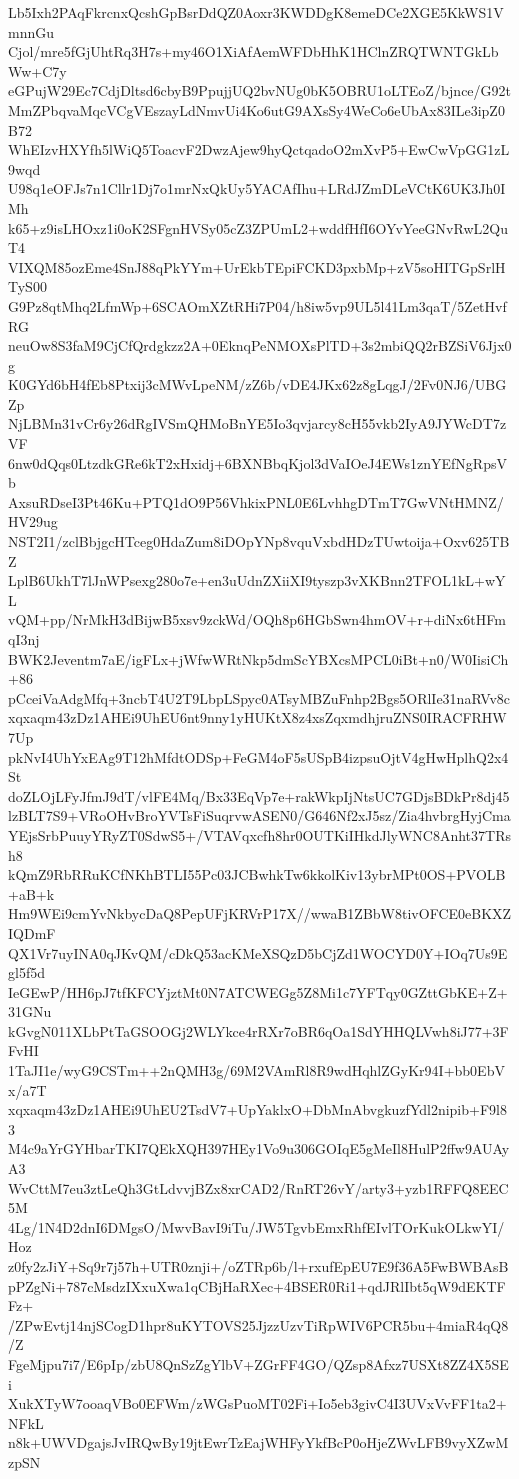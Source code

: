 Lb5Ixh2PAqFkrcnxQcshGpBsrDdQZ0Aoxr3KWDDgK8emeDCe2XGE5KkWS1VmnnGu
Cjol/mre5fGjUhtRq3H7s+my46O1XiAfAemWFDbHhK1HClnZRQTWNTGkLbWw+C7y
eGPujW29Ec7CdjDltsd6cbyB9PpujjUQ2bvNUg0bK5OBRU1oLTEoZ/bjnce/G92t
MmZPbqvaMqcVCgVEszayLdNmvUi4Ko6utG9AXsSy4WeCo6eUbAx83ILe3ipZ0B72
WhEIzvHXYfh5lWiQ5ToacvF2DwzAjew9hyQctqadoO2mXvP5+EwCwVpGG1zL9wqd
U98q1eOFJs7n1Cllr1Dj7o1mrNxQkUy5YACAfIhu+LRdJZmDLeVCtK6UK3Jh0IMh
k65+z9isLHOxz1i0oK2SFgnHVSy05cZ3ZPUmL2+wddfHfI6OYvYeeGNvRwL2QuT4
VIXQM85ozEme4SnJ88qPkYYm+UrEkbTEpiFCKD3pxbMp+zV5soHITGpSrlHTyS00
G9Pz8qtMhq2LfmWp+6SCAOmXZtRHi7P04/h8iw5vp9UL5l41Lm3qaT/5ZetHvfRG
neuOw8S3faM9CjCfQrdgkzz2A+0EknqPeNMOXsPlTD+3s2mbiQQ2rBZSiV6Jjx0g
K0GYd6bH4fEb8Ptxij3cMWvLpeNM/zZ6b/vDE4JKx62z8gLqgJ/2Fv0NJ6/UBGZp
NjLBMn31vCr6y26dRgIVSmQHMoBnYE5Io3qvjarcy8cH55vkb2IyA9JYWcDT7zVF
6nw0dQqs0LtzdkGRe6kT2xHxidj+6BXNBbqKjol3dVaIOeJ4EWs1znYEfNgRpsVb
AxsuRDseI3Pt46Ku+PTQ1dO9P56VhkixPNL0E6LvhhgDTmT7GwVNtHMNZ/HV29ug
NST2I1/zclBbjgcHTceg0HdaZum8iDOpYNp8vquVxbdHDzTUwtoija+Oxv625TBZ
LplB6UkhT7lJnWPsexg280o7e+en3uUdnZXiiXI9tyszp3vXKBnn2TFOL1kL+wYL
vQM+pp/NrMkH3dBijwB5xsv9zckWd/OQh8p6HGbSwn4hmOV+r+diNx6tHFmqI3nj
BWK2Jeventm7aE/igFLx+jWfwWRtNkp5dmScYBXcsMPCL0iBt+n0/W0IisiCh+86
pCceiVaAdgMfq+3ncbT4U2T9LbpLSpyc0ATsyMBZuFnhp2Bgs5ORlIe31naRVv8c
xqxaqm43zDz1AHEi9UhEU6nt9nny1yHUKtX8z4xsZqxmdhjruZNS0IRACFRHW7Up
pkNvI4UhYxEAg9T12hMfdtODSp+FeGM4oF5sUSpB4izpsuOjtV4gHwHplhQ2x4St
doZLOjLFyJfmJ9dT/vlFE4Mq/Bx33EqVp7e+rakWkpIjNtsUC7GDjsBDkPr8dj45
lzBLT7S9+VRoOHvBroYVTsFiSuqrvwASEN0/G646Nf2xJ5sz/Zia4hvbrgHyjCma
YEjsSrbPuuyYRyZT0SdwS5+/VTAVqxcfh8hr0OUTKiIHkdJlyWNC8Anht37TRsh8
kQmZ9RbRRuKCfNKhBTLI55Pc03JCBwhkTw6kkolKiv13ybrMPt0OS+PVOLB+aB+k
Hm9WEi9cmYvNkbycDaQ8PepUFjKRVrP17X//wwaB1ZBbW8tivOFCE0eBKXZIQDmF
QX1Vr7uyINA0qJKvQM/cDkQ53acKMeXSQzD5bCjZd1WOCYD0Y+IOq7Us9Egl5f5d
IeGEwP/HH6pJ7tfKFCYjztMt0N7ATCWEGg5Z8Mi1c7YFTqy0GZttGbKE+Z+31GNu
kGvgN011XLbPtTaGSOOGj2WLYkce4rRXr7oBR6qOa1SdYHHQLVwh8iJ77+3FFvHI
1TaJI1e/wyG9CSTm++2nQMH3g/69M2VAmRl8R9wdHqhlZGyKr94I+bb0EbVx/a7T
xqxaqm43zDz1AHEi9UhEU2TsdV7+UpYaklxO+DbMnAbvgkuzfYdl2nipib+F9l83
M4c9aYrGYHbarTKI7QEkXQH397HEy1Vo9u306GOIqE5gMeIl8HulP2ffw9AUAyA3
WvCttM7eu3ztLeQh3GtLdvvjBZx8xrCAD2/RnRT26vY/arty3+yzb1RFFQ8EEC5M
4Lg/1N4D2dnI6DMgsO/MwvBavI9iTu/JW5TgvbEmxRhfEIvlTOrKukOLkwYI/Hoz
z0fy2zJiY+Sq9r7j57h+UTR0znji+/oZTRp6b/l+rxufEpEU7E9f36A5FwBWBAsB
pPZgNi+787cMsdzIXxuXwa1qCBjHaRXec+4BSER0Ri1+qdJRlIbt5qW9dEKTFFz+
/ZPwEvtj14njSCogD1hpr8uKYTOVS25JjzzUzvTiRpWIV6PCR5bu+4miaR4qQ8/Z
FgeMjpu7i7/E6pIp/zbU8QnSzZgYlbV+ZGrFF4GO/QZsp8Afxz7USXt8ZZ4X5SEi
XukXTyW7ooaqVBo0EFWm/zWGsPuoMT02Fi+Io5eb3givC4I3UVxVvFF1ta2+NFkL
n8k+UWVDgajsJvIRQwBy19jtEwrTzEajWHFyYkfBcP0oHjeZWvLFB9vyXZwMzpSN
